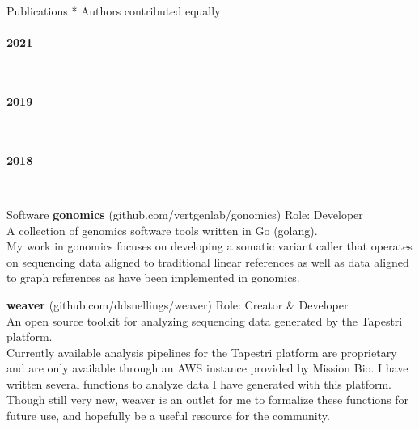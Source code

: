 \documentclass{resume} %
\begin{document}
\begin{rSection}{Publications}
{* Authors contributed equally}
\\ \\ {\bf 2021} 
\item {}
\\ \\{\bf 2019} 
\item {}
\item {}
\\ \\ {\bf 2018}
\item {}
\item {}
\\
\end{rSection}


\begin{rSection}{Software}
{\bf gonomics} {(github.com/vertgenlab/gonomics)} \hfill{Role: Developer}
\\ {A collection of genomics software tools written in Go (golang).}
\\ {My work in gonomics focuses on developing a somatic variant caller that operates on sequencing data 
aligned to traditional linear references as well as data aligned to graph references as have been implemented
in gonomics.}

{\bf weaver} {(github.com/ddsnellings/weaver)} \hfill{Role: Creator \& Developer}
\\ {An open source toolkit for analyzing sequencing data generated by the Tapestri platform.}
\\ {Currently available analysis pipelines for the Tapestri platform are proprietary and are only available through an 
AWS instance provided by Mission Bio. I have written several functions to analyze data I have generated with this
platform. Though still very new, weaver is an outlet for me to formalize these functions for future use, and hopefully 
be a useful resource for the community.}

\end{rSection}
\end{document}
